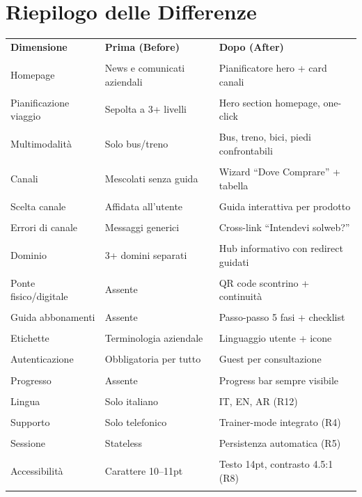 \documentclass[11pt,a4paper]{article}
\begin{document}
\vspace{0.5cm}

\section{Riepilogo delle Differenze}

\begin{tcolorbox}[colback=backgroundColor,colframe=primaryColor,arc=2mm]
{\small
\renewcommand{\arraystretch}{1.3}
\begin{tabular}{|p{3.5cm}|p{5cm}|p{5cm}|}
\hline
\textbf{Dimensione} & \textbf{Prima (Before)} & \textbf{Dopo (After)} \\\\
\hline
Homepage & News e comunicati aziendali & Pianificatore hero + card canali \\\\
\hline
Pianificazione viaggio & Sepolta a 3+ livelli & Hero section homepage, one-click \\\\
\hline
Multimodalit\`a & Solo bus/treno & Bus, treno, bici, piedi confrontabili \\\\
\hline
Canali & Mescolati senza guida & Wizard ``Dove Comprare'' + tabella \\\\
\hline
Scelta canale & Affidata all'utente & Guida interattiva per prodotto \\\\
\hline
Errori di canale & Messaggi generici & Cross-link ``Intendevi solweb?'' \\\\
\hline
Dominio & 3+ domini separati & Hub informativo con redirect guidati \\\\
\hline
Ponte fisico/digitale & Assente & QR code scontrino + continuit\`a \\\\
\hline
Guida abbonamenti & Assente & Passo-passo 5 fasi + checklist \\\\
\hline
Etichette & Terminologia aziendale & Linguaggio utente + icone \\\\
\hline
Autenticazione & Obbligatoria per tutto & Guest per consultazione \\\\
\hline
Progresso & Assente & Progress bar sempre visibile \\\\
\hline
Lingua & Solo italiano & IT, EN, AR (R12) \\\\
\hline
Supporto & Solo telefonico & Trainer-mode integrato (R4) \\\\
\hline
Sessione & Stateless & Persistenza automatica (R5) \\\\
\hline
Accessibilit\`a & Carattere 10--11pt & Testo 14pt, contrasto 4.5:1 (R8) \\\\
\hline
\end{tabular}
}
\end{tcolorbox}
\end{document}

